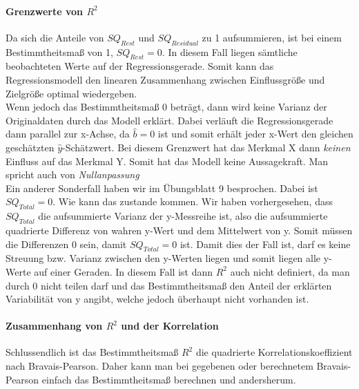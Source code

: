 \documentclass[a4paper]{article}
\begin{document}
\paragraph{Grenzwerte von $R^2$} Da sich die Anteile von $SQ_{Rest}$ und $SQ_{Residual}$ zu 1 aufsummieren, ist bei einem Bestimmtheitsmaß von 1, $SQ_{Rest}=0$. In diesem Fall liegen sämtliche beobachteten Werte auf der Regressionsgerade. Somit kann das Regressionsmodell den linearen Zusammenhang zwischen Einflussgröße und Zielgröße optimal wiedergeben.\\
Wenn jedoch das Bestimmtheitsmaß 0 beträgt, dann wird keine Varianz der Originaldaten durch das Modell erklärt. Dabei verläuft die Regressionsgerade dann parallel zur x-Achse, da $\hat{b}=0$ ist und somit erhält jeder x-Wert den gleichen geschätzten $\hat{y}$-Schätzwert. Bei diesem Grenzwert hat das Merkmal X dann \textit{keinen} Einfluss auf das Merkmal Y. Somit hat das Modell keine Aussagekraft. Man spricht auch von \textit{Nullanpassung}\\
Ein anderer Sonderfall haben wir im Übungsblatt 9 besprochen. Dabei ist $SQ_{Total}=0$. Wie kann das zustande kommen. Wir haben vorhergesehen, dass $SQ_{Total}$ die aufsummierte Varianz der y-Messreihe ist, also die aufsummierte quadrierte Differenz von wahren y-Wert und dem Mittelwert von y. Somit müssen die Differenzen 0 sein, damit $SQ_{Total}=0$ ist. Damit dies der Fall ist, darf es keine Streuung bzw. Varianz zwischen den y-Werten liegen und somit liegen alle y-Werte auf einer Geraden. In diesem Fall ist dann $R^2$ auch nicht definiert, da man durch 0 nicht teilen darf und das Bestimmtheitsmaß den Anteil der erklärten Variabilität von y angibt, welche jedoch überhaupt nicht vorhanden ist.
\paragraph{Zusammenhang von $R^2$ und der Korrelation}
Schlussendlich ist das Bestimmtheitsmaß $R^2$ die quadrierte Korrelationskoeffizient nach Bravais-Pearson. Daher kann man bei gegebenen oder berechnetem Bravais-Pearson einfach das Bestimmtheitsmaß berechnen und andersherum.
\end{document}
